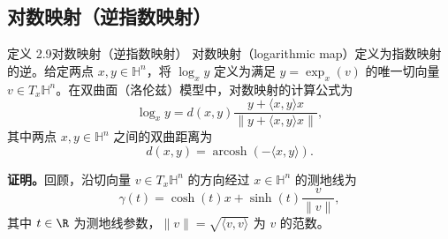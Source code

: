 \subsection{对数映射（逆指数映射）}
\begin{statement}{定义 2.9}{对数映射（逆指数映射）}
对数映射（logarithmic map）定义为指数映射的逆。给定两点 $x,y\in\mathbb H^n$，将 $\log_x y$ 定义为满足 $y=\exp_x(v)$ 的唯一切向量 $v\in T_x\mathbb H^n$。在双曲面（洛伦兹）模型中，对数映射的计算公式为
\begin{equation*}
  \log_x y=d(x,y)\frac{y+\langle x,y\rangle x}
                       {\lVert y+\langle x,y\rangle x\rVert},
  \tag{2.116}\label{eq:2.116}
\end{equation*}
其中两点 $x,y\in\mathbb H^n$ 之间的双曲距离为
\begin{equation*}
  d(x,y)=\operatorname{arcosh}(-\langle x,y\rangle).
  \tag{2.117}\label{eq:2.117}
\end{equation*}

\textbf{证明。}回顾，沿切向量 $v\in T_x\mathbb H^n$ 的方向经过 $x\in\mathbb H^n$ 的测地线为
\begin{equation*}
  \gamma(t)=\cosh(t)x+\sinh(t)\frac{v}{\lVert v\rVert},
  \tag{2.118}\label{eq:2.118}
\end{equation*}
其中 $t\in\R$ 为测地线参数，$\lVert v\rVert=\sqrt{\langle v,v\rangle}$ 为 $v$ 的范数。


\end{statement}
